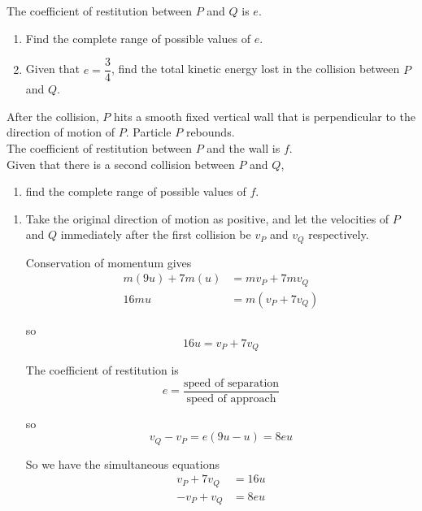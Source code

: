 \documentclass[leqno]{article}
\begin{document}
\begin{enumerate}[
  label=\textbf{\arabic*.},
  leftmargin=*,
  topsep=0pt,
  partopsep=0pt,
  parsep=0pt
]
The coefficient of restitution between $P$ and $Q$ is $e$. \\
\begin{enumerate}[label=\textbf{(\alph*)}]
  \item Find the complete range of possible values of $e$.  \\
  \item Given that $e=\dfrac{3}{4}$, find the total kinetic energy lost in the collision between $P$ and $Q$.  \\
\end{enumerate}
After the collision, $P$ hits a smooth fixed vertical wall that is perpendicular to the direction of motion of $P$. Particle $P$ rebounds. \\
The coefficient of restitution between $P$ and the wall is $f$. \\

Given that there is a second collision between $P$ and $Q$, \\
\begin{enumerate}[label=\textbf{(\alph*)}, resume]
  \item find the complete range of possible values of $f$.  \\
\end{enumerate}

\vspace*{10pt}

\begin{djsSolution}
\begin{enumerate}[label=\textbf{(\alph*)}]
  \item Take the original direction of motion as positive, and let the velocities of $P$ and $Q$ immediately after the first collision be $v_P$ and $v_Q$ respectively.

  Conservation of momentum gives
  \begin{align*}
  m(9u)+7m(u)&=mv_P+7mv_Q \\
  16mu&=m(v_P+7v_Q)
  \end{align*}

  so
  \[
  16u=v_P+7v_Q
  \]

  The coefficient of restitution is
  \[
  e=\frac{\text{speed of separation}}{\text{speed of approach}}
  \]

  so
  \[
  v_Q-v_P=e(9u-u)=8eu
  \]

  So we have the simultaneous equations
  \begin{align*}
  v_P+7v_Q&=16u \\
  -v_P+v_Q&=8eu
  \end{align*}


\end{enumerate}
\end{djsSolution}
\end{enumerate}
\end{document}

